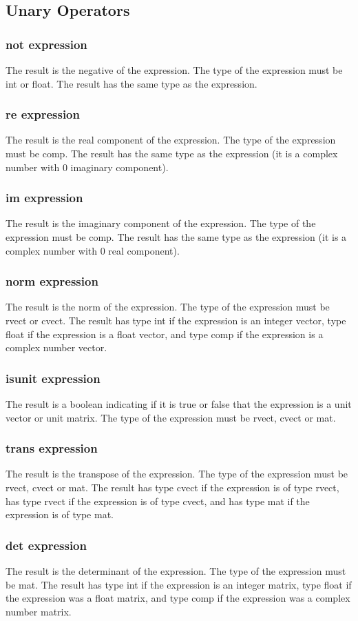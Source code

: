 \subsection{Unary Operators}
\subsubsection{not expression}
The result is the negative of the expression. The type of the expression must be int or float. The result has the same type as the expression.
\subsubsection{re expression}
The result is the real component of the expression. The type of the expression must be comp. The result has the same type as the expression (it is a complex number with  0 imaginary component).
\subsubsection{im expression}
The result is the imaginary component of the expression. The type of the expression must be comp. The result has the same type as the expression (it is a complex number with  0 real component).
\subsubsection{norm expression}
The result is the norm of the expression. The type of the expression must be rvect or cvect. The result has type int if the expression is an integer vector, type float if the expression is a float vector, and type comp if the expression is a complex number vector.
\subsubsection{isunit expression}
The result is a boolean indicating if it is true or false that the expression is a unit vector or unit matrix. The type of the expression must be rvect, cvect or mat.
\subsubsection{trans expression}
The result is the transpose of the expression. The type of the expression must be rvect, cvect or mat. The result has type cvect if the expression is of type rvect, has type rvect if the expression is of type cvect, and has type mat if the expression is of type mat.
\subsubsection{det expression}
The result is the determinant of the expression. The type of the expression must be mat. The result has type int if the expression is an integer matrix,  type float if the expression was a float matrix, and type comp if the expression was a complex number matrix.

